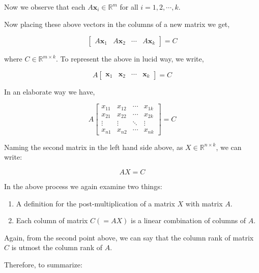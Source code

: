 \documentclass[a4paper]{article}
\begin{document}
Now we observe that each $A\boldsymbol{x}_i \in \mathbb{R}^{m}$ for all $i=1,2,\cdots,k$.

Now placing these above vectors in the columns of a new matrix we get,

\begin{equation} 
\begin{bmatrix}
A\boldsymbol{x}_1 & A\boldsymbol{x}_2 & \cdots & A\boldsymbol{x}_k 
\end{bmatrix} = C
\end{equation}

where $C \in \mathbb{R}^{m \times k}$. 
To represent the above in lucid way, we write,

\begin{equation} 
A\begin{bmatrix}
\boldsymbol{x}_1 & \boldsymbol{x}_2 & \cdots & \boldsymbol{x}_k 
\end{bmatrix} = C
\end{equation}

In an elaborate way we have,

\begin{equation}
A\begin{bmatrix}
x_{11} & x_{12} & \cdots & x_{1k} \\
x_{21} & x_{22} & \cdots & x_{2k} \\
\vdots & \vdots & \ddots & \vdots \\
x_{n1} & x_{n2} & \cdots & x_{nk}
\end{bmatrix} = C
\end{equation}

Naming the second matrix in the left hand side above, as $X \in \mathbb{R}^{n\times k}$, we can write:

\begin{equation}
AX = C
\end{equation}

In the above process we again examine two things:

\begin{enumerate}
\item A definition for the post-multiplication of a matrix $X$ with matrix $A$.
\item Each column of matrix $C(=AX)$ is a linear combination of columns of $A$.
\end{enumerate}
Again, from the second point above, we can say that the column rank of matrix $C$ is utmost the column rank of $A$.

Therefore, to summarize:
\end{document}
